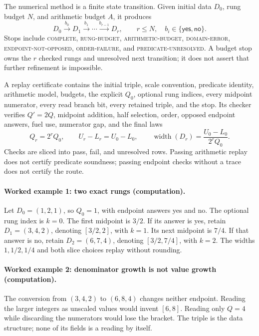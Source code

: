 The numerical method is a finite state transition.  Given initial data \(D_0\), rung budget \(N\), and arithmetic
budget \(A\), it produces
\[
 D_0\xrightarrow{b_0}D_1\xrightarrow{b_1}\cdots
 \xrightarrow{b_{r-1}}D_r,\qquad r\leq N,\quad b_i\in\{\mathsf{yes},\mathsf{no}\}.
\]
Stops include \textsc{complete}, \textsc{rung-budget}, \textsc{arithmetic-budget}, \textsc{domain-error},
\textsc{endpoint-not-opposed}, \textsc{order-failure}, and \textsc{predicate-unresolved}.  A budget stop owns the
\(r\) checked rungs and unresolved next transition; it does not assert that further refinement is impossible.

A replay certificate contains the initial triple, scale convention, predicate identity, arithmetic model, budgets,
the explicit \(Q_0\), optional rung indices, every midpoint numerator, every read branch bit, every retained triple,
and the stop.  Its checker verifies \(Q'=2Q\), midpoint addition, half selection, order, opposed endpoint answers,
fuel use, numerator gap, and the final laws
\[
 Q_r=2^rQ_0,\qquad U_r-L_r=U_0-L_0,\qquad
 \operatorname{width}(D_r)=\frac{U_0-L_0}{2^rQ_0}.
\]
Checks are sliced into pass, fail, and unresolved rows.  Passing arithmetic replay does not certify predicate
soundness; passing endpoint checks without a trace does not certify the route.

\paragraph{Worked example 1: two exact rungs (computation).}
Let \(D_0=(1,2,1)\), so \(Q_0=1\), with endpoint answers yes and no.  The optional rung index is \(k=0\).  The first
midpoint is \(3/2\).  If its answer is yes, retain \(D_1=(3,4,2)\), denoting \([3/2,2]\), with \(k=1\).  Its next
midpoint is \(7/4\).  If that answer is no, retain \(D_2=(6,7,4)\), denoting \([3/2,7/4]\), with \(k=2\).  The widths
\(1,1/2,1/4\) and both slice choices replay without rounding.

\paragraph{Worked example 2: denominator growth is not value growth (computation).}
The conversion from \((3,4,2)\) to \((6,8,4)\) changes neither endpoint.  Reading the larger integers as unscaled
values would invent \([6,8]\).  Reading only \(Q=4\) while discarding the numerators would lose the bracket.  The triple
is the data structure; none of its fields is a reading by itself.

